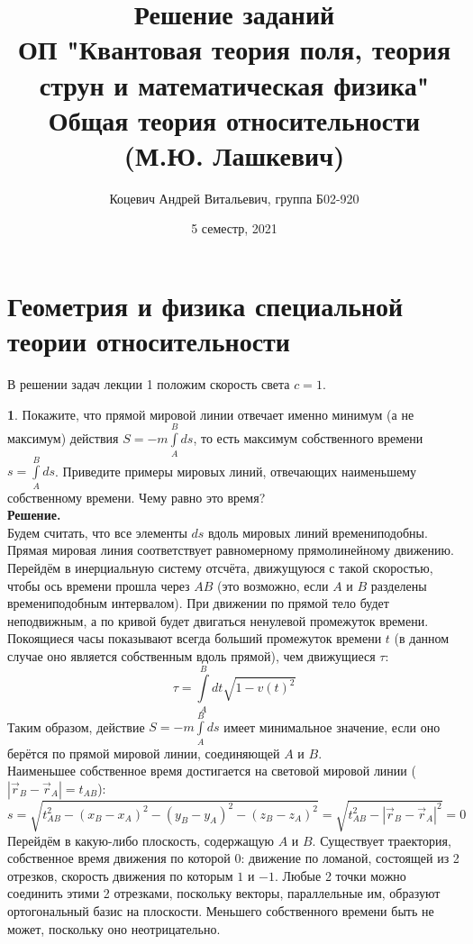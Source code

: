 \documentclass[12pt]{article}
\title{Решение заданий\\ ОП "Квантовая теория поля, теория струн и математическая физика"\\[2cm]
Общая теория относительности\\ (М.Ю. Лашкевич)}
\author{Коцевич Андрей Витальевич, группа Б02-920}
\date{5 семестр, 2021}
\theoremstyle{definition}
\newtheorem{zad}{}[section]
\begin{document}
\maketitle
\newpage
\tableofcontents{}
\newpage
\section{Геометрия и физика специальной теории относительности}
В решении задач лекции 1 положим скорость света $c=1$.
\begin{zad}
Покажите, что прямой мировой линии отвечает именно минимум (а не максимум) действия $S=-m\int\limits_A^B ds$, то есть максимум собственного времени $s=\int\limits_A^B ds$. Приведите примеры мировых линий, отвечающих наименьшему собственному времени. Чему равно это время?\\
\textbf{Решение.}\\
Будем считать, что все элементы $ds$ вдоль мировых линий времениподобны. Прямая мировая линия соответствует равномерному прямолинейному движению. Перейдём в инерциальную систему отсчёта, движущуюся с такой скоростью, чтобы ось времени прошла через $AB$ (это возможно, если $A$ и $B$ разделены времениподобным интервалом). При движении по прямой тело будет неподвижным, а по кривой будет двигаться ненулевой промежуток времени. Покоящиеся часы показывают всегда больший промежуток времени $t$ (в данном случае оно является собственным вдоль прямой), чем движущиеся $\tau$:
\begin{equation}
    \tau=\int\limits_A^B dt\sqrt{1-v(t)^2}
\end{equation}
Таким образом, действие $S=-m\int\limits_A^B ds$ имеет минимальное значение, если оно берётся по прямой мировой линии, соединяющей $A$ и $B$.\\
Наименьшее собственное время достигается на световой мировой линии ($|\vec{r}_B-\vec{r}_A|=t_{AB}$):
\begin{equation}
    s=\sqrt{t_{AB}^2-(x_B-x_A)^2-(y_B-y_A)^2-(z_B-z_A)^2}=\sqrt{t_{AB}^2-|\vec{r}_B-\vec{r}_A|^2}=0
\end{equation}
Перейдём в какую-либо плоскость, содержащую $A$ и $B$. Существует траектория, собственное время движения по которой 0: движение по ломаной, состоящей из 2 отрезков, скорость движения по которым $1$ и $-1$. Любые 2 точки можно соединить этими 2 отрезками, поскольку векторы, параллельные им, образуют ортогональный базис на плоскости. Меньшего собственного времени быть не может, поскольку оно неотрицательно.\\
\end{zad}
\end{document}
